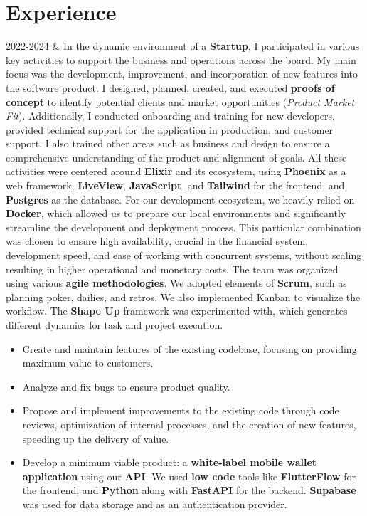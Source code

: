 \documentclass[
    changecolor={111, 156, 45}, 
]{cv-roald}
\begin{document}
\section*{Experience}
\begin{tabularcv}
2022-2024 & 
\newline
In the dynamic environment of a \textbf{Startup}, I participated in various key activities to support the business and operations across the board. My main focus was the development, improvement, and incorporation of new features into the software product. I designed, planned, created, and executed \textbf{proofs of concept} to identify potential clients and market opportunities (\textit{Product Market Fit}). Additionally, I conducted onboarding and training for new developers, provided technical support for the application in production, and customer support. I also trained other areas such as business and design to ensure a comprehensive understanding of the product and alignment of goals. All these activities were centered around \textbf{Elixir} and its ecosystem, using \textbf{Phoenix} as a web framework, \textbf{LiveView}, \textbf{JavaScript}, and \textbf{Tailwind} for the frontend, and \textbf{Postgres} as the database. For our development ecosystem, we heavily relied on \textbf{Docker}, which allowed us to prepare our local environments and significantly streamline the development and deployment process. This particular combination was chosen to ensure high availability, crucial in the financial system, development speed, and ease of working with concurrent systems, without scaling resulting in higher operational and monetary costs. The team was organized using various \textbf{agile methodologies}. We adopted elements of \textbf{Scrum}, such as planning poker, dailies, and retros. We also implemented Kanban to visualize the workflow. The \textbf{Shape Up} framework was experimented with, which generates different dynamics for task and project execution.
\begin{itemize}
      \item Create and maintain features of the existing codebase, focusing on providing maximum value to customers.
\item Analyze and fix bugs to ensure product quality.
\item Propose and implement improvements to the existing code through code reviews, optimization of internal processes, and the creation of new features, speeding up the delivery of value.
\item Develop a minimum viable product: a \textbf{white-label mobile wallet application} using our \textbf{API}. We used \textbf{low code} tools like \textbf{FlutterFlow} for the frontend, and \textbf{Python} along with \textbf{FastAPI} for the backend. \textbf{Supabase} was used for data storage and as an authentication provider.

\end{itemize}
\end{tabularcv}
\end{document}
